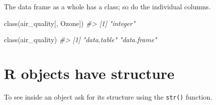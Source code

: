 \documentclass[
]{book}
\newenvironment{Shaded}{\begin{snugshade}}{\end{snugshade}}
\newcommand{\CommentTok}[1]{\textcolor[rgb]{0.56,0.35,0.01}{\textit{#1}}}
\newcommand{\FunctionTok}[1]{\textcolor[rgb]{0.00,0.00,0.00}{#1}}
\newcommand{\NormalTok}[1]{#1}
\begin{document}
The data frame as a whole has a class; so do the individual columns.

\begin{Shaded}
\begin{Highlighting}[]
\FunctionTok{class}\NormalTok{(air\_quality[, Ozone])}
\CommentTok{\#\textgreater{} [1] "integer"}

\FunctionTok{class}\NormalTok{(air\_quality)}
\CommentTok{\#\textgreater{} [1] "data.table" "data.frame"}
\end{Highlighting}
\end{Shaded}

\hypertarget{r-objects-have-structure}{%
\section{R objects have structure}\label{r-objects-have-structure}}

To see inside an object ask for its structure using the \texttt{str()} function.
\end{document}
